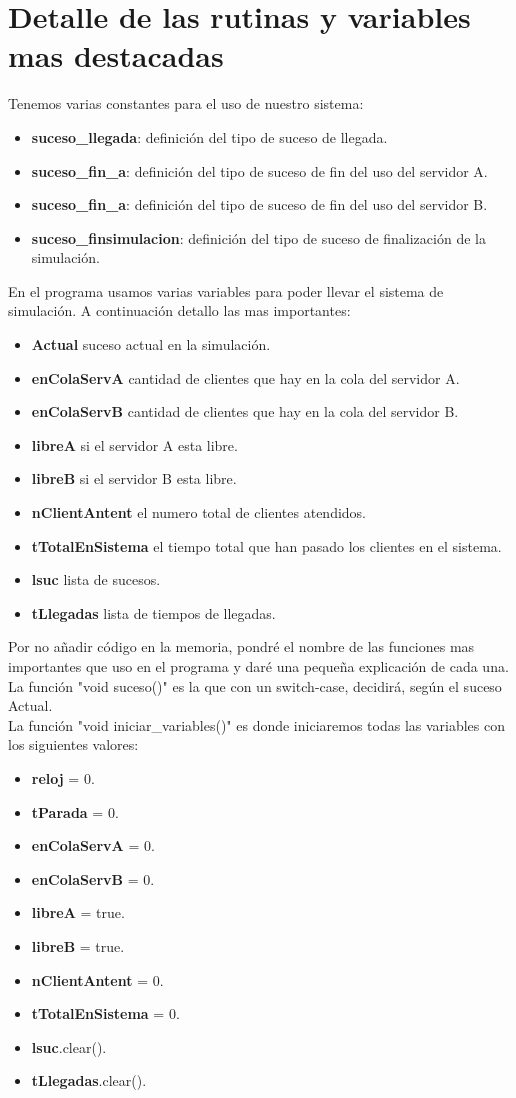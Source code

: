 \documentclass[12pt,a4paper]{article}
\begin{document}
\section{Detalle de las rutinas y variables mas destacadas}
Tenemos varias constantes para el uso de nuestro sistema:
\begin{itemize}
\item \textbf{suceso\_llegada}: definición del tipo de suceso de llegada.
\item \textbf{suceso\_fin\_a}: definición del tipo de suceso de fin del uso del servidor A.
\item \textbf{suceso\_fin\_a}: definición del tipo de suceso de fin del uso del servidor B.
\item \textbf{suceso\_finsimulacion}: definición del tipo de suceso de finalización de la simulación.
\end{itemize}
En el programa usamos varias variables para poder llevar el sistema de simulación. A continuación detallo las mas importantes:
\begin{itemize}
	\item \textbf{Actual} suceso actual en la simulación.
	\item \textbf{enColaServA} cantidad de clientes que hay en la cola del servidor A.
	\item \textbf{enColaServB} cantidad de clientes que hay en la cola del servidor B.
	\item \textbf{libreA} si el servidor A esta libre.
	\item \textbf{libreB} si el servidor B esta libre.
	\item \textbf{nClientAntent} el numero total de clientes atendidos.
	\item \textbf{tTotalEnSistema} el tiempo total que han pasado los clientes en el sistema. 
	\item \textbf{lsuc} lista de sucesos.
	\item \textbf{tLlegadas} lista de tiempos de llegadas.
\end{itemize}
Por no añadir código en la memoria, pondré el nombre de las funciones mas importantes que uso en el programa y daré una pequeña explicación de cada una.\\
La función "void suceso()" es la que con un switch-case, decidirá, según el suceso Actual.\\
La función "void iniciar\_variables()"  es donde iniciaremos todas las variables con los siguientes valores: 
\begin{itemize}
	\item \textbf{reloj} = 0.
	\item \textbf{tParada} = 0.
	\item \textbf{enColaServA} = 0.
	\item \textbf{enColaServB} = 0.
	\item \textbf{libreA} = true.
	\item \textbf{libreB} = true.
	\item \textbf{nClientAntent} = 0.
	\item \textbf{tTotalEnSistema} = 0.
	\item \textbf{lsuc}.clear().
	\item \textbf{tLlegadas}.clear().
\end{itemize}
\end{document}
